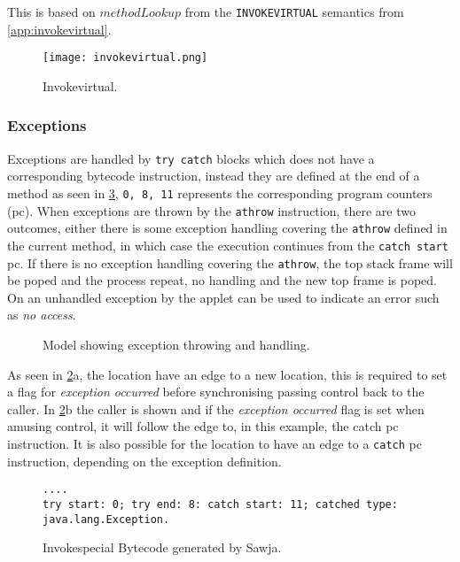 This is based on $methodLookup$ from the \texttt{INVOKEVIRTUAL} semantics from \cref{app:invokevirtual}.

 
\begin{figure}[H]
\centering
\texttt{[image: invokevirtual.png]}
\caption{Invokevirtual.}
\label{fig:invokevirtual}
\end{figure}

\subsubsection{Exceptions}
\label{sec:exceptions}
Exceptions are handled by \texttt{try catch} blocks which does not have a corresponding bytecode instruction, instead they are defined at the end of a method as seen in \cref{lst:exception}, \texttt{0, 8, 11} represents the corresponding program counters (pc). When exceptions are thrown by the \texttt{athrow} instruction, there are two outcomes, either there is some exception handling covering the \texttt{athrow} defined in the current method, in which case the execution continues from the \texttt{catch start} pc. If there is no exception handling covering the \texttt{athrow}, the top stack frame will be poped and the process repeat, no handling and the new top frame is poped. On \jc an unhandled exception by the applet can be used to indicate an error such as \textit{no access}.

\begin{figure}[H]
\label{fig:uppaal2}
\caption{Model showing exception throwing and handling.}
\end{figure}

As seen in \cref{fig:uppaal2}a, the  location have an edge to a new location, this is required to set a flag for \textit{exception occurred} before synchronising passing control back to the caller. In \cref{fig:uppaal2}b the caller is shown and if the \textit{exception occurred} flag is set when amusing control, it will follow the edge to, in this example, the catch pc instruction. It is also possible for the  location to have an edge to a \texttt{catch} pc instruction, depending on the exception definition.




\begin{figure}
  \begin{lstlisting}
....
try start: 0; try end: 8: catch start: 11; catched type: java.lang.Exception.
  \end{lstlisting}
  \caption{Invokespecial Bytecode generated by Sawja.}
  \label{lst:exception}
\end{figure}



